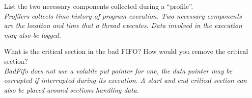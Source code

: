 \documentclass[11pt]{article}
\begin{document}
\begin{pset}
  List the two necessary components collected during a “profile”.\\
\textit{Profilers collects time history of program execution. Two necessary components are the location and time that a thread executes. Data involved in the execution may also be logged.}

  What is the critical section in the bad FIFO? How would you remove the critical section?\\
\textit{BadFifo does not use a volatile put pointer for one, the data pointer may be corrupted if interrupted during its execution. A start and end critical section can also be placed around sections handling data.}

\end{pset}
\end{document}
